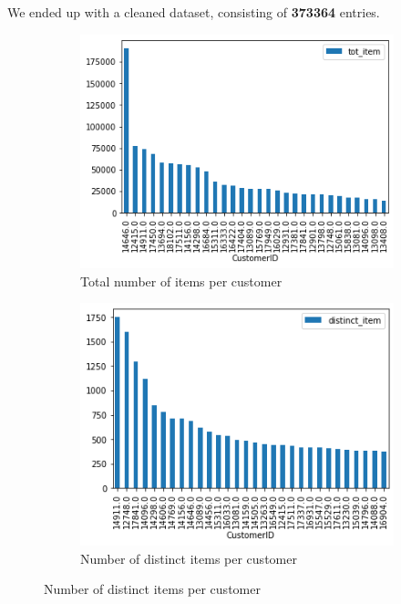 We ended up with a cleaned dataset, consisting of \textbf{373364} entries.

\begin{figure}[h!]
\captionsetup{justification=centering}
\begin{subfigure}{.3\textwidth}
\centering
\includegraphics[width=\textwidth]{img/tot_item.png}
\caption{Total number of items per customer}
\label{fig:tot_item}
\end{subfigure}
\begin{subfigure}{.3\textwidth}
\centering
\includegraphics[width=\textwidth]{img/distinct_item.png}
\caption{Number of distinct items per customer}
\label{ref:distinct_item}
\end{subfigure}

\end{figure}
